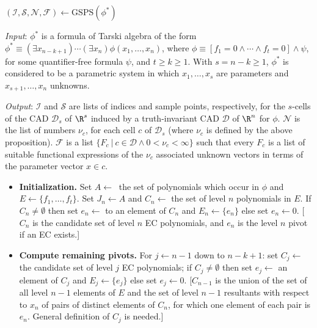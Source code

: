 \documentclass{article}
\begin{document}
\begin{algorithm}
\caption{Generic Solutions for a Parametric System}

\medskip
\noindent 
    $(\mathcal{I}, \mathcal{S}, \mathcal{N}, \mathcal{F}) \leftarrow \mathrm{GSPS}(\phi^*)$

\medskip
\emph{Input}: $\phi^*$ is a formula of Tarski algebra of the form
            $\phi^* \equiv (\exists x_{n-k+1}) \cdots (\exists x_n)
            \phi(x_1, \ldots, x_n)$, where
        $\phi \equiv [f_1 = 0 \wedge \cdots \wedge f_t = 0] \wedge \psi$,
        for some quantifier-free formula $\psi$, and $t \ge k \ge 1$.
        With $s = n-k \ge 1$, $\phi^*$ is considered to be a parametric system in which $x_1, \ldots, x_s$ are parameters and 
        $x_{s+1}, \ldots, x_n$ unknowns.

\medskip
\emph{Output}: ${\mathcal I}$ and $\mathcal{S}$ are lists of indices
and sample points, respectively, 
for the $s$-cells of the CAD $\mathcal{D}_s$ of $\R^s$ induced by a
truth-invariant CAD $\mathcal{D}$ of $\R^n$ for $\phi$.
$\mathcal{N}$ is the list of numbers $\nu_c$, for each cell $c$ of
$\mathcal{D}_s$ (where $\nu_c$ is defined by the above proposition).
${\mathcal F}$ is a list $\{F_c~|~c \in {\mathcal D} \wedge
0 < \nu_c < \infty\}$ such that every $F_c$ is a list of
suitable functional expressions of the $\nu_c$ associated unknown vectors
in terms of the parameter vector $x \in c$.

\medskip
\begin{itemize}
    \item[1.] \textbf{Initialization.} Set $A \leftarrow ~$ the set of 
    polynomials which occur in $\phi$ and
    $E \leftarrow \{f_1, \ldots, f_t\}$. 
    Set $J_n \leftarrow A$ and $C_n \leftarrow$ the set of level $n$ polynomials in $E$.
    If $C_n \neq \emptyset$ then 
        set $e_n \leftarrow$ to an element of $C_n$ and
        $E_n \leftarrow \{e_n\}$ 
    else
        set $e_n \leftarrow 0$. 
    [$C_n$ is the candidate set of
    level $n$ EC polynomials, and $e_n$ is the level $n$ pivot
    if an EC exists.]

\medskip
     \item[2.] \textbf{Compute remaining pivots.}
     For $j \leftarrow n-1$ down to $n-k+1$: 
        set $C_j \leftarrow$ the candidate set of level $j$ EC polynomials;
        if $C_j \neq \emptyset$ then 
            set $e_j \leftarrow$ an element of $C_j$ and $E_j \leftarrow \{e_j\}$ 
            else set $e_j \leftarrow 0$.
     [$C_{n-1}$ is the union of the set of all level $n-1$ elements
     of $E$ and the set of level $n-1$ resultants with respect to $x_n$
     of pairs of distinct elements of $C_n$, for which one element
     of each pair is $e_n$. General definition of $C_j$ is needed.]


\end{itemize}
\end{algorithm}
\end{document}
